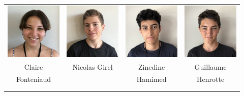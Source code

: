 \begin{center}
\begin{tabular}{cccc}
\includegraphics[angle=270,origin=c, width=27mm]{eleves/Fonteniaud Claire.JPG} &
\includegraphics[angle=270,origin=c, width=27mm]{eleves/Girel Nicolas.JPG} &
\includegraphics[angle=270,origin=c, width=27mm]{eleves/Hamimed Zinedine.JPG} &
\includegraphics[angle=270,origin=c, width=27mm]{eleves/Henrotte Guillaume.JPG} \\
Claire & Nicolas Girel & Zinedine & Guillaume \\ Fonteniaud & & Hamimed & Henrotte \\ \\ \\


\end{tabular}
\end{center}
